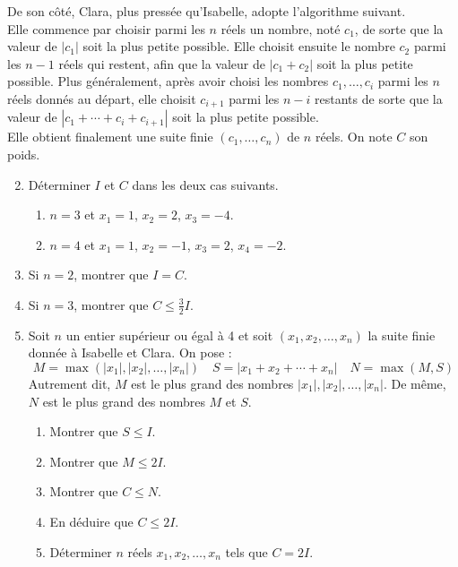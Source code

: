 \documentclass[landscape,twocolumn,leqno,a4paper,10pt]{report} %
\renewcommand{\leq}{\leqslant}
\begin{document}
De son côté, Clara, plus pressée qu'Isabelle, adopte l'algorithme suivant.\\
Elle commence par choisir parmi les $n$ réels un nombre, noté $c_{1}$, de sorte que la valeur de $\left|c_{1}\right|$ soit la plus petite possible. Elle choisit ensuite le nombre $c_{2}$ parmi les $n-1$ réels qui restent, afin que la valeur de $\left|c_{1}+c_{2}\right|$ soit la plus petite possible. Plus généralement, après avoir choisi les nombres $c_{1}, \ldots, c_{i}$ parmi les $n$ réels donnés au départ, elle choisit $c_{i+1}$ parmi les $n-i$ restants de sorte que la valeur de $\left|c_{1}+\cdots+c_{i}+c_{i+1}\right|$ soit la plus petite possible.\\
Elle obtient finalement une suite finie $\left(c_{1}, \ldots, c_{n}\right)$ de $n$ réels. On note $C$ son poids.

\begin{enumerate}\setcounter{enumi}{1}
	\item Déterminer $I$ et $C$ dans les deux cas suivants.
	\begin{enumerate}
		\item $n=3$ et $x_{1}=1$, $x_{2}=2$, $x_{3}=-4$.
		\item $n=4$ et $x_{1}=1$, $x_{2}=-1$, $x_{3}=2$, $x_{4}=-2$.
	\end{enumerate}
	\item Si $n=2$, montrer que $I=C$.
	\item Si $n=3$, montrer que $C \leq \frac{3}{2} I$.
	\item Soit $n$ un entier supérieur ou égal à 4 et soit $\left(x_{1}, x_{2}, \ldots, x_{n}\right)$ la suite finie donnée à Isabelle et Clara. On pose :
	$$M=\max \left(\left|x_{1}\right|,\left|x_{2}\right|, \ldots,\left|x_{n}\right|\right) \quad S=\left|x_{1}+x_{2}+\cdots+x_{n}\right| \quad N=\max (M, S)$$
	Autrement dit, $M$ est le plus grand des nombres $\left|x_{1}\right|,\left|x_{2}\right|, \ldots,\left|x_{n}\right|$. De même, $N$ est le plus grand des nombres $M$ et $S$.
	\begin{enumerate}
		\item Montrer que $S \leq I$.
		\item Montrer que $M \leq 2 I$.
		\item Montrer que $C \leq N$.
		\item En déduire que $C \leq 2 I$.
		\item Déterminer $n$ réels $x_{1}, x_{2}, \ldots, x_{n}$ tels que $C=2 I$.
	\end{enumerate}
\end{enumerate}
\end{document}
